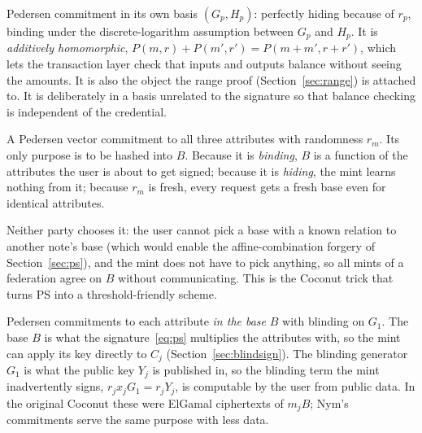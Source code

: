 \documentclass[10pt,a5paper]{article}
\newcommand{\K}[1]{#1}                      %
\newcommand{\Go}[1]{#1}                     %
\newcommand{\K}[1]{{\color{ScalarCol}#1}}   %
\newcommand{\Go}[1]{{\color{GoneCol}#1}}    %
\begin{document}
\begin{whybox}
\begin{description}[nosep,leftmargin=1.2em]
\item[$\Go{P}$ -- the amount commitment.] Pedersen commitment in its own
  basis $(\Go{G_p},\Go{H_p})$: perfectly hiding because of $\K{r_p}$, binding
  under the discrete-logarithm assumption between $\Go{G_p}$ and $\Go{H_p}$. It is
  \emph{additively homomorphic}, $\Go{P}(\K{m},\K{r}) + \Go{P}(\K{m'},\K{r'}) = \Go{P}(\K{m+m'},\K{r+r'})$,
  which lets the transaction layer check that inputs and outputs balance
  without seeing the amounts. It is also the object the range proof
  (Section~\ref{sec:range}) is attached to. It is deliberately in a basis
  unrelated to the signature so that balance checking is independent of the
  credential.
\item[$\Go{C_m}$ -- the commitment behind $\Go{B}$.] A Pedersen vector
  commitment to all three attributes with randomness $\K{r_m}$. Its only
  purpose is to be hashed into $\Go{B}$. Because it is \emph{binding},
  $\Go{B}$ is a function of the attributes the user is about to get signed;
  because it is \emph{hiding}, the mint learns nothing from it; because
  $\K{r_m}$ is fresh, every request gets a fresh base even for identical
  attributes.
\item[$\Go{B}$ -- the signature base.] Neither party chooses it: the user
  cannot pick a base with a known relation to another note's base (which would
  enable the affine-combination forgery of Section~\ref{sec:ps}), and the mint
  does not have to pick anything, so all mints of a federation agree on
  $\Go{B}$ without communicating. This is the Coconut trick that turns PS into
  a threshold-friendly scheme.
\item[$\Go{C_j}$ -- the blinded attributes.] Pedersen commitments to each
  attribute \emph{in the base} $\Go{B}$ with blinding on $\Go{G_1}$. The base
  $\Go{B}$ is what the signature~\eqref{eq:ps} multiplies the attributes with,
  so the mint can apply its key directly to $\Go{C_j}$
  (Section~\ref{sec:blindsign}). The blinding generator $\Go{G_1}$ is what the
  public key $\Go{Y_j}$ is published in, so the blinding term the mint
  inadvertently signs, $\K{r_j}\K{x_j}\Go{G_1} = \K{r_j}\Go{Y_j}$, is computable by the user
  from public data. In the original Coconut these were ElGamal ciphertexts of
  $\K{m_j}\Go{B}$; Nym's commitments serve the same purpose with less data.
\end{description}
\end{whybox}
\end{document}

